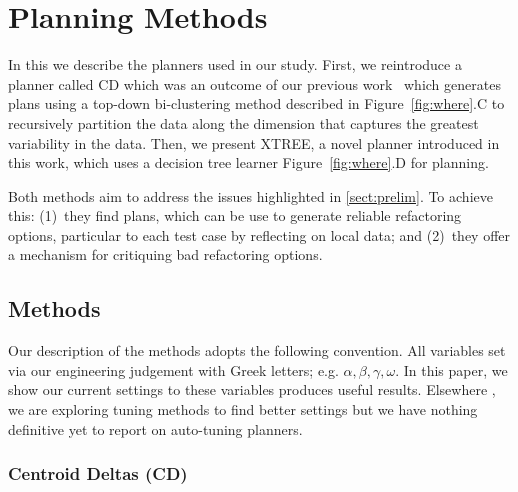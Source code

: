 \documentclass{sig-alternate}
\newcommand{\tion}[1]{\textsection\ref{sect:#1}}
\newcommand{\fig}[1]{Figure~\ref{fig:#1}}
\begin{document}

  
\section{Planning Methods}\label{sect:planners}
 
In this we describe the planners used in our study. First, we reintroduce a planner called CD which was an outcome of our previous work~\cite{me12c} which generates plans using a top-down bi-clustering method described in \fig{where}.C to recursively partition the data along the dimension that captures the greatest variability in the data. Then, we present XTREE, a novel planner introduced in this work, which uses a decision tree learner \fig{where}.D for planning.


Both methods aim to address the issues highlighted in \tion{prelim}. To achieve this: (1)~they find plans, which can be use to generate reliable refactoring options, particular to each test case by reflecting on local data; and (2)~they offer a mechanism for critiquing bad refactoring options.


\subsection{  Methods}

Our  description of the methods adopts the following convention. All variables set via  our engineering judgement  with Greek letters; e.g. $\alpha,\beta,\gamma,\omega$. In this paper, we show our current settings to these variables produces useful results. Elsewhere \cite{krall14,fu:ase15}, we are exploring tuning methods to find better settings but  we have nothing definitive yet to report on auto-tuning planners.

\subsubsection{Centroid Deltas (CD)}

\end{document}
